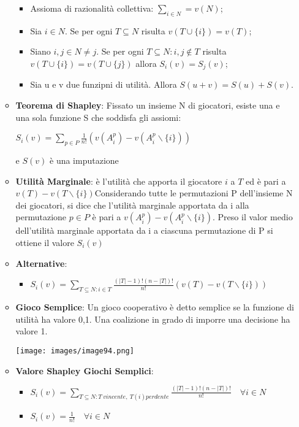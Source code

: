 \documentclass{article}
\theoremstyle{definition}
\theoremstyle{remark}
\begin{document}
\begin{itemize}
\begin{itemize}
\begin{itemize}
            \item Assioma di razionalità collettiva: $\sum_{i\in N}=v(N)$;
            \item Sia $i\in N$. Se per ogni $T\subseteq N$ risulta $v(T\cup \{i\})=v(T)$;
            \item Siano $i,j\in N\neq j$. Se per ogni $T\subseteq N:i,j\not\in T$ risulta $v(T\cup\{i\})=v(T\cup\{j\})$ allora $S_i(v)=S_j(v)$;
            \item Sia u e v due funzipni di utilità. Allora $S(u+v)=S(u)+S(v)$.
        \end{itemize}
        \item \textbf{Teorema di Shapley}: Fissato un insieme N di giocatori, esiste una e una sola funzione S che soddisfa gli assiomi:\begin{center}
            $S_i(v)=\sum_{p\in P} \frac{1}{n!}(v(A_i^p)-v(A_i^p\backslash\{i\}))$
        \end{center}
        e $S(v)$ è una imputazione
        \item \textbf{Utilità Marginale}: è l'utilità che apporta il giocatore $i$ a $T$ ed è pari a $v(T)-v(T\backslash\{i\})$\newline Considerando tutte le permutazioni P dell'insieme N dei giocatori, si dice che l'utilità marginale apportata da i alla permutazione $p\in P$ è pari a $v(A_i^p)-v(A_i^p\backslash\{i\})$. Preso il valor medio dell'utilità marginale apportata da i a ciascuna permutazione di P si ottiene il valore $S_i(v)$
        \item \textbf{Alternative}:\begin{itemize}
            \item $S_i(v)=\sum_{T\subseteq N:i\in T}\frac{(|T|-1)!(n-|T|)!}{n!}(v(T)-v(T\backslash\{i\}))$
        \end{itemize}
        \item \textbf{Gioco Semplice}: Un gioco cooperativo è detto semplice se la funzione di utilità ha valore 0,1. Una coalizione in grado di imporre una decisione ha valore 1.\begin{center}
            \texttt{[image: images/image94.png]}
        \end{center}
        \item\textbf{Valore Shapley Giochi Semplici}:\begin{itemize}
            \item $S_i(v)=\sum_{T\subseteq N: T\ vincente,\ T(i) perdente}\frac{(|T|-1)!(n-|T|)!}{n!}\quad\forall i\in N$
            \item $S_i(v)=\frac{1}{n!}\quad \forall i\in N$

\end{itemize}
\end{itemize}
\end{itemize}
\end{document}
